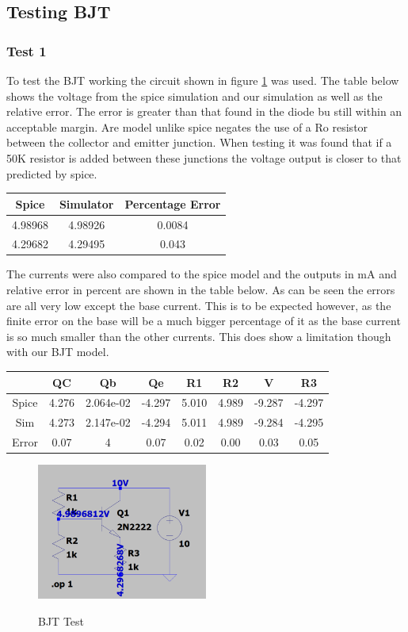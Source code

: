 \documentclass{article}
\begin{document}
\subsection{Testing BJT}
\subsubsection{Test 1}
To test the BJT working the circuit shown in figure \ref{fig:BJTTest1} was used. The table below shows the voltage from the spice simulation and our simulation as well as the relative error. The error is greater than that found in the diode bu still within an acceptable margin. Are model unlike spice negates the use of a Ro resistor between the collector and emitter junction. When testing it was found that if a 50K resistor is added between these junctions the voltage output is closer to that predicted by spice. 
\begin{center}
\begin{tabular}{ ||c| c ||c ||}
\hline
 Spice & Simulator & Percentage Error \\ 
 \hline
 4.98968 & 4.98926 & 0.0084 \\  
 4.29682 & 4.29495 & 0.043 \\   
 \hline
\end{tabular}
\end{center}
The currents were also compared to the spice model and the outputs in mA and relative error in percent are shown in the table below. As can be seen the errors are all very low except the base current. This is to be expected however, as the finite error on the base will be a much bigger percentage of it as the base current is so much smaller than the other currents. This does show a limitation though with our BJT model. 
\begin{center}
\begin{tabular}{ ||c| c |c |c | c| c| c| c ||}
\hline
  & QC & Qb & Qe & R1 & R2 & V & R3 \\ 
  \hline
 Spice & 4.276 & 2.064e-02 & -4.297 & 5.010 & 4.989 & -9.287 & -4.297\\
 Sim & 4.273& 2.147e-02& -4.294& 5.011& 4.989& -9.284& -4.295  \\
 Error &  0.07& 4 & 0.07 & 0.02 & 0.00 & 0.03 & 0.05  \\   
 \hline
\end{tabular}
\end{center}
\begin{figure}[h]
    \caption{BJT Test}
    \centering
    \includegraphics[width=0.5\textwidth]{images/BJTTest1.png}
    \label{fig:BJTTest1}
\end{figure}
\newpage
\end{document}
